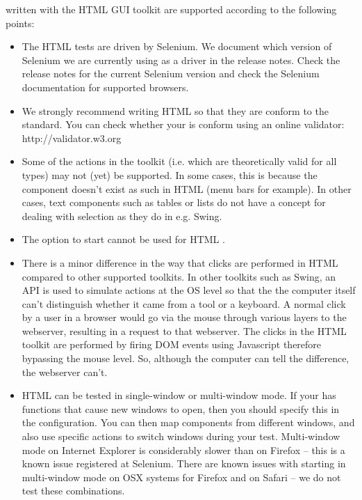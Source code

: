 \gdauts{} written with the HTML GUI toolkit are supported according to the following points:

\begin{itemize}
\item The HTML tests are driven by Selenium. We document which version of Selenium we are currently using  as a driver in the release notes. Check the release notes for the current Selenium version and check the Selenium documentation for supported browsers. 
\item We strongly recommend writing HTML \gdauts{} so that they are conform to the  standard. You can check whether your \gdaut{} is  conform using an online validator: http://validator.w3.org
\item Some of the  actions in the  toolkit (i.e. which are theoretically valid for all \gdaut{} types) may not (yet) be supported. In some cases, this is because the component doesn't exist as such in HTML \gdauts{} (menu bars for example). In other cases, text components such as tables or lists do not have a concept for dealing with selection as they do in e.g. Swing. 
\item The  option to start \gdauts{}  cannot be used for HTML \gdauts{}. 
\item There is a minor difference in the way that clicks are performed in HTML compared to other supported toolkits. In other toolkits such as Swing, an API is used to simulate actions at the OS level so that the the computer itself can't distinguish whether it came from a tool or a keyboard. A normal click by a user in a browser would go via the mouse through various layers to the webserver, resulting in a request to that webserver. The clicks in the HTML toolkit are performed by firing DOM events using Javascript therefore bypassing the mouse level. So, although the computer can tell the difference, the webserver can't. 
\item HTML \gdauts{} can be tested in single-window or multi-window mode. If your \gdaut{} has functions that cause new windows to open, then you should specify this in the \gdaut{} configuration. You can then map components from different windows, and also use specific actions to switch windows during your test. Multi-window mode on Internet Explorer is considerably slower than on Firefox -- this is a known issue registered at Selenium. There are known issues with \gdaut{} starting in multi-window mode on OSX systems for Firefox and on Safari -- we do not test these combinations.
\end{itemize}
